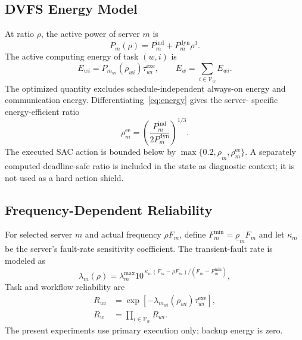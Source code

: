 \documentclass[lettersize,journal]{IEEEtran}
\begin{document}
\subsection{DVFS Energy Model}
At ratio $\rho$, the active power of server $m$ is
\begin{equation}
 P_m(\rho)=P_m^{\mathrm{ind}}+P_m^{\mathrm{dyn}}\rho^3.
 \label{eq:power}
\end{equation}
The active computing energy of task $(w,i)$ is
\begin{equation}
 E_{wi}=P_{m_{wi}}(\rho_{wi})\tau^{\mathrm{exe}}_{wi},
 \qquad E_w=\sum_{i\in\mathcal{V}_w}E_{wi}.
 \label{eq:energy}
\end{equation}
The optimized quantity excludes schedule-independent always-on energy and
communication energy. Differentiating~\eqref{eq:energy} gives the server-
specific energy-efficient ratio
\begin{equation}
 \rho_m^{\mathrm{ee}}=
 \left(\frac{P_m^{\mathrm{ind}}}{2P_m^{\mathrm{dyn}}}\right)^{1/3}.
 \label{eq:rhoee}
\end{equation}
The executed SAC action is bounded below by
$\max\{0.2,\underline\rho_m,\rho_m^{\mathrm{ee}}\}$. A separately computed
deadline-safe ratio is included in the state as diagnostic context; it is not
used as a hard action shield.

\subsection{Frequency-Dependent Reliability}
For selected server $m$ and actual frequency $\rho F_m$, define
$F_m^{\min}=\underline\rho_mF_m$ and let $\kappa_m$ be the server's fault-rate
sensitivity coefficient. The transient-fault rate is modeled as
\begin{equation}
 \lambda_m(\rho)=\lambda_m^{\max}
 10^{\,\kappa_m(F_m-\rho F_m)/(F_m-F_m^{\min})},
 \label{eq:fault_rate}
\end{equation}
Task and workflow reliability are
\begin{align}
 R_{wi}&=\exp[-\lambda_{m_{wi}}(\rho_{wi})\tau^{\mathrm{exe}}_{wi}],\\
 R_w&=\prod_{i\in\mathcal{V}_w}R_{wi}.
 \label{eq:reliability}
\end{align}
The present experiments use primary execution only; backup energy is zero.
\end{document}
